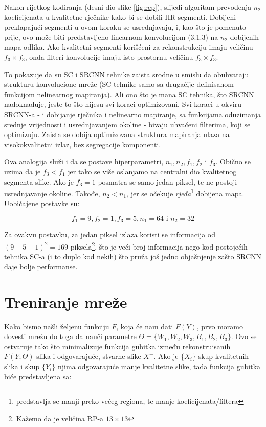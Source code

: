 \documentclass[12pt]{report}
\numberwithin{equation}{section}
\begin{document}
Nakon rijetkog kodiranja (desni dio slike \ref{fig:rep}), slijedi algoritam prevođenja $n_2$ koeficijenata u kvalitetne rječnike kako bi se dobili HR segmenti. Dobijeni preklapajući segmenti u ovom koraku se usrednjavaju, i, kao što je pomenuto prije, ovo može biti predstavljeno linearnom konvolucijom (3.1.3) na $n_2$ dobijenih mapa odlika. Ako kvalitetni segmenti korišćeni za rekonstrukciju imaju veličinu $f_3 \times f_3$, onda filteri konvolucije imaju isto prostornu veličinu $f_3 \times f_3$. 

To pokazuje da su SC i SRCNN tehnike zaista srodne u smislu da obuhvataju strukturu konvolucione mreže (SC tehnike samo sa drugačije definisanom funkcijom nelinearnog mapiranja). Ali ono što je mana SC tehnika, što SRCNN nadoknađuje, jeste to što nijesu svi koraci optimizovani. Svi koraci u okviru SRCNN-a - i dobijanje rječnika i nelinearno mapiranje, sa funkcijama oduzimanja srednje vrijednosti i usrednjavanjem okoline - bivaju uhvaćeni filterima, koji se optimizuju. Zaista se dobija optimizovana struktura mapiranja ulaza na visokokvalitetni izlaz, bez segregacije komponenti. 

Ova analogija služi i da se postave hiperparametri, $n_1, n_2, f_1, f_2$ i $f_3$.  Obično se uzima da je $f_3 < f_1$ jer tako se više oslanjamo na centralni dio kvalitetnog segmenta slike. Ako je $f_3 = 1$ posmatra se samo jedan piksel, te ne postoji usrednjavanje okoline. Takođe, $n_2 < n_1$, jer se očekuje \textit{rjeđa}\footnote{predstavlja se manji preko većeg regiona, te manje koeficijenata/filtera} dobijena mapa. Uobičajene postavke su: 

\begin{equation}
  f_1 = 9, f_2 = 1, f_3 = 5, n_1 = 64 \text{ i } n_2 = 32
\end{equation}


 Za ovakvu postavku, za jedan piksel izlaza koristi se informacija  od $(9 + 5 - 1)^2 = 169$ piksela\footnote{Kažemo da je veličina RP-a $13 \times 13$}, što je veći broj informacija nego kod postojećih tehnika SC-a  (i to duplo kod nekih) što pruža još jedno objašnjenje zašto SRCNN daje bolje performanse.  

\section{Treniranje mreže}\label{ch2}


Kako bismo našli željenu funkciju $F$, koja će nam dati $F(Y)$, prvo moramo dovesti mrežu do toga da nauči parametre $\Theta = \{W_1 , W_2 , W_3 , B_1 , B_2 , B_3\}$. Ovo se ostvaruje tako što minimalizuje funkcija gubitka između rekonstruisanih $F(Y; \Theta)$ slika i odgovarajuće, stvarne slike $X^{+}$. Ako je $\{X_i\}$ skup kvalitetnih slika i skup $\{Y_i\}$ njima odgovarajuće manje kvalitetne slike, tada funkcija gubitka biće predstavljena sa:  
\end{document}

